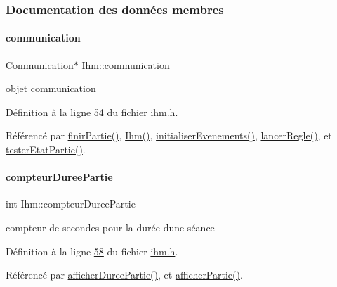 \subsubsection{Documentation des données membres}
\mbox{\label{class_ihm_a2f3d4781795781a840786cd8c2233899}} 
\paragraph{\texorpdfstring{communication}{communication}}
{\footnotesize\ttfamily \hyperlink{class_communication}{Communication}$\ast$ Ihm\+::communication\hspace{0.3cm}{\ttfamily [private]}}



objet communication 



Définition à la ligne \hyperlink{ihm_8h_source_l00054}{54} du fichier \hyperlink{ihm_8h_source}{ihm.\+h}.



Référencé par \hyperlink{ihm_8cpp_source_l00365}{finir\+Partie()}, \hyperlink{ihm_8cpp_source_l00026}{Ihm()}, \hyperlink{ihm_8cpp_source_l00075}{initialiser\+Evenements()}, \hyperlink{ihm_8cpp_source_l00623}{lancer\+Regle()}, et \hyperlink{ihm_8cpp_source_l00641}{tester\+Etat\+Partie()}.

\mbox{\label{class_ihm_a61e4a83f8ca0f177971af808e51be5bb}} 
\paragraph{\texorpdfstring{compteur\+Duree\+Partie}{compteurDureePartie}}
{\footnotesize\ttfamily int Ihm\+::compteur\+Duree\+Partie\hspace{0.3cm}{\ttfamily [private]}}



compteur de secondes pour la durée d\textquotesingle{}une séance 



Définition à la ligne \hyperlink{ihm_8h_source_l00058}{58} du fichier \hyperlink{ihm_8h_source}{ihm.\+h}.



Référencé par \hyperlink{ihm_8cpp_source_l00484}{afficher\+Duree\+Partie()}, et \hyperlink{ihm_8cpp_source_l00333}{afficher\+Partie()}.

